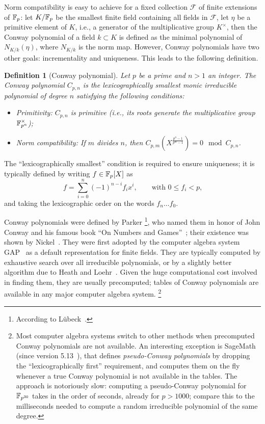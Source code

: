 \documentclass{sig-alternate}
\newtheorem{definition}[theorem]{Definition}
\begin{document}
Norm compatibility is easy to achieve for a fixed collection
$\mathcal{F}$ of finite extensions of $\mathbb{F}_{p}$: let $K/\mathbb{F}_{p}$ be the
smallest finite field containing all fields in $\mathcal{F}$, let
$\eta$ be a primitive element of $K$, i.e., a generator of the
multiplicative group $K^\times$, then the Conway polynomial of a field
$k\subset K$ is defined as the minimal polynomial of $N_{K/k}(\eta)$,
where $N_{K/k}$ is the norm map. %
However, Conway polynomials have two other goals: incrementality and
uniqueness. %
This leads to the following definition.

\begin{definition}[Conway polynomial]
  Let $p$ be a prime and $n>1$ an integer. %
  The \emph{Conway polynomial} $C_{p,n}$ is the
  \emph{lexicographically smallest} monic irreducible polynomial of
  degree $n$ satisfying the following conditions:
  \begin{itemize}
  \item \emph{Primitivity:} $C_{p,n}$ is primitive (i.e., its roots
    generate the multiplicative group $\mathbb{F}_{p^n}^\times$);
  \item \emph{Norm compatibility:} If $m$ divides $n$, then
    $C_{p,m}\left(X^{\frac{p^n-1}{p^m-1}}\right) = 0 \mod C_{p,n}$.
  \end{itemize}
\end{definition}

The ``lexicographically smallest'' condition is required to ensure
uniqueness; it is typically defined by writing $f\in\mathbb{F}_{p}[X]$ as
\begin{equation*}
  f = \sum_{i=0}^n (-1)^{n-i} f_i x^i,
  \qquad\text{with $0\le f_i<p$,}
\end{equation*}
and taking the lexicographic order on the words $f_n\dots f_0$.

Conway polynomials were defined by Parker%
\footnote{According to Lübeck~\cite{Luebeck}.}, %
who named them in honor of John Conway and his famous book ``On
Numbers and Games''~\cite{Conway:ONAG2000}; their existence was shown
by Nickel~\cite{Nickel1988}. %
They were first adopted by the computer algebra system GAP~\cite{GAP4}
as a default representation for finite fields. %
They are typically computed by exhaustive search over all irreducible
polynomials, or by a slightly better algorithm due to Heath and
Loehr~\cite{heath+loehr99}. %
Given the huge computational cost involved in finding them, they are
usually precomputed; tables of Conway polynomials are available in any
major computer algebra system.%
\footnote{Most computer algebra systems switch to other methods when
  precomputed Conway polynomials are not available. %
  An interesting exception is SageMath (since version
  5.13~\cite{Roe2013}), that defines \emph{pseudo-Conway polynomials}
  by dropping the ``lexicographically first'' requirement, and
  computes them on the fly whenever a true Conway polynomial is not
  available in the tables. %
  The approach is notoriously slow: computing a pseudo-Conway
  polynomial for $\mathbb{F}_{p^{30}}$ takes in the order of seconds, already
  for $p>1000$; compare this to the milliseconds needed to compute a
  random irreducible polynomial of the same degree.} %
\end{document}
